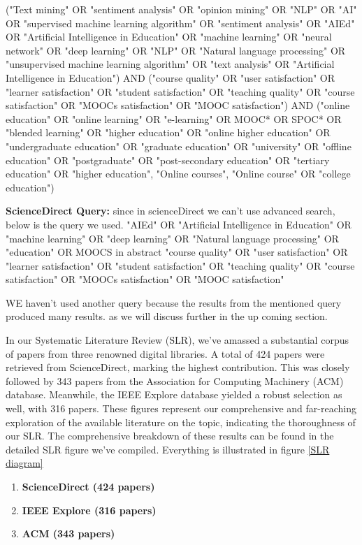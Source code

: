 ("Text mining" OR "sentiment analysis" OR "opinion mining" OR "NLP" OR "AI" OR "supervised machine learning algorithm" OR "sentiment analysis" OR "AIEd" OR "Artificial Intelligence in Education" OR "machine learning" OR "neural network" OR "deep learning" OR "NLP" OR "Natural language processing" OR "unsupervised machine learning algorithm" OR "text analysis" OR "Artificial Intelligence in Education")
AND
("course quality" OR "user satisfaction" OR "learner satisfaction" OR "student satisfaction" OR "teaching quality" OR "course satisfaction" OR "MOOCs satisfaction" OR "MOOC satisfaction")
AND
("online education" OR "online learning" OR "e-learning" OR MOOC* OR SPOC* OR "blended learning" OR "higher education" OR "online higher education" OR "undergraduate education" OR "graduate education" OR "university" OR "offline education" OR "postgraduate" OR "post-secondary education" OR "tertiary education" OR "higher education", "Online courses", "Online course" OR "college education")

\textbf{ScienceDirect Query: } 
since in scienceDirect we can't use advanced search, below is the query we used. 
"AIEd" OR "Artificial Intelligence in Education" OR "machine learning" OR "deep learning" OR "Natural language processing" OR "education" OR MOOCS
in abstract 
"course quality" OR "user satisfaction" OR "learner satisfaction" OR "student satisfaction" OR "teaching quality" OR "course satisfaction" OR "MOOCs satisfaction" OR "MOOC satisfaction"

WE haven't used another query because the results from the mentioned query produced many results. as we will discuss further in the up coming section.

In our Systematic Literature Review (SLR), we've amassed a substantial corpus of papers from three renowned digital libraries. A total of 424 papers were retrieved from ScienceDirect, marking the highest contribution. This was closely followed by 343 papers from the Association for Computing Machinery (ACM) database. Meanwhile, the IEEE Explore database yielded a robust selection as well, with 316 papers. These figures represent our comprehensive and far-reaching exploration of the available literature on the topic, indicating the thoroughness of our SLR. The comprehensive breakdown of these results can be found in the detailed SLR figure we've compiled. Everything is illustrated in figure \ref{SLR diagram}
\begin{enumerate}
    \item \textbf{ScienceDirect (424 papers)} 
    \item \textbf{IEEE Explore (316 papers)}
    \item \textbf{ACM (343 papers)}
\end{enumerate}

